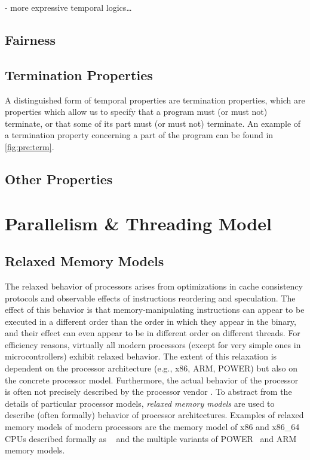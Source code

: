 \begin{definition}[LTL]
\end{definition}

- more expressive temporal logics…

\subsection{Fairness}

\subsection{Termination Properties}

A distinguished form of temporal properties are termination properties, which are properties which allow us to specify that a program must (or must not) terminate, or that some of its part must (or must not) terminate.
An example of a termination property concerning a part of the program can be found in \autoref{fig:pre:term}.

\subsection{Other Properties}

\section{Parallelism \& Threading Model}

\subsection{Relaxed Memory Models}

The relaxed behavior of processors arises from optimizations in cache consistency protocols and observable effects of instructions reordering and speculation.
The effect of this behavior is that memory-manipulating instructions can appear to be executed in a different order than the order in which they appear in the binary, and their effect can even appear to be in different order on different threads.
For efficiency reasons, virtually all modern processors (except for very simple ones in microcontrollers) exhibit relaxed behavior.
The extent of this relaxation is dependent on the processor architecture (e.g., x86, ARM, POWER) but also on the concrete processor model.
Furthermore, the actual behavior of the processor is often not precisely described by the processor vendor \cite{x86tso}.
To abstract from the details of particular processor models, \emph{relaxed memory models} are used to describe (often formally) behavior of processor architectures.
Examples of relaxed memory models of modern processors are the memory model of x86 and x86\_64 CPUs described formally as \xtso~\cite{x86tso} and the multiple variants of POWER~\cite{Sarkar2011,Mador-Haim2012} and ARM~\cite{Flur2016,Alglave2014,Pulte2017} memory models.

